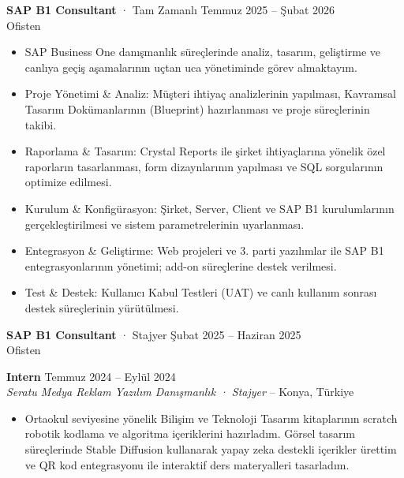 \documentclass[a4paper,8pt]{article}
\begin{document}
\vspace{0pt}
{\small \textbf{SAP B1 Consultant} · Tam Zamanlı \hfill Temmuz 2025 -- Şubat 2026}\\
{\small Ofisten}
\begin{itemize}
\item {\small SAP Business One danışmanlık süreçlerinde analiz, tasarım, geliştirme ve canlıya geçiş aşamalarının uçtan uca yönetiminde görev almaktayım.}
\item {\small Proje Yönetimi \& Analiz: Müşteri ihtiyaç analizlerinin yapılması, Kavramsal Tasarım Dokümanlarının (Blueprint) hazırlanması ve proje süreçlerinin takibi.}
\item {\small Raporlama \& Tasarım: Crystal Reports ile şirket ihtiyaçlarına yönelik özel raporların tasarlanması, form dizaynlarının yapılması ve SQL sorgularının optimize edilmesi.}
\item {\small Kurulum \& Konfigürasyon: Şirket, Server, Client ve SAP B1 kurulumlarının gerçekleştirilmesi ve sistem parametrelerinin uyarlanması.}
\item {\small Entegrasyon \& Geliştirme: Web projeleri ve 3. parti yazılımlar ile SAP B1 entegrasyonlarının yönetimi; add-on süreçlerine destek verilmesi.}
\item {\small Test \& Destek: Kullanıcı Kabul Testleri (UAT) ve canlı kullanım sonrası destek süreçlerinin yürütülmesi.}
\end{itemize}

\vspace{0pt}
{\small \textbf{SAP B1 Consultant} · Stajyer \hfill Şubat 2025 -- Haziran 2025}\\
{\small Ofisten}

\vspace{0pt}

\textbf{Intern} \hfill {\small Temmuz 2024 -- Eylül 2024}\\
{\small \textit{Seratu Medya Reklam Yazılım Danışmanlık · Stajyer} -- Konya, Türkiye}
\begin{itemize}
\item {\small Ortaokul seviyesine yönelik Bilişim ve Teknoloji Tasarım kitaplarının scratch robotik kodlama ve algoritma içeriklerini hazırladım. Görsel tasarım süreçlerinde Stable Diffusion kullanarak yapay zeka destekli içerikler ürettim ve QR kod entegrasyonu ile interaktif ders materyalleri tasarladım.}
\end{itemize}

\vspace{0pt}
\end{document}
